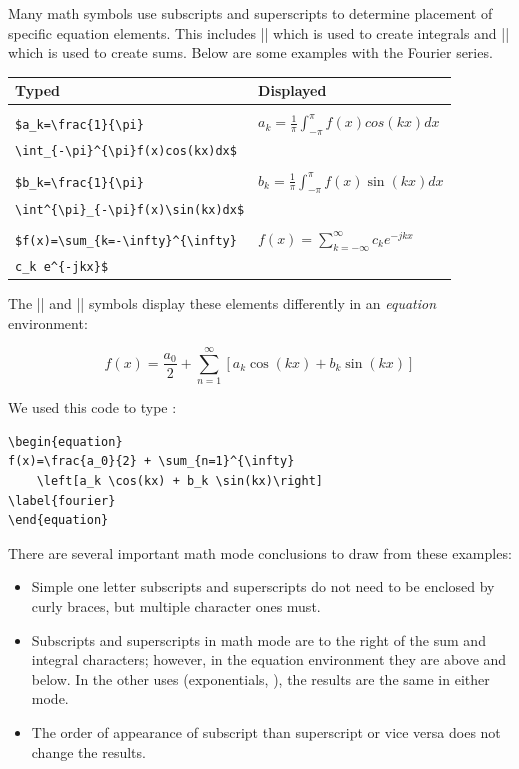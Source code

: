 Many math symbols use subscripts and superscripts to determine placement of
specific equation elements.  This includes |\int| which is used to create
integrals and |\sum| which is used to create sums. Below are some examples with
the Fourier series.

\begin{center}
\begin{tabular}{l|l}
Typed                   & Displayed\\\hline
\\
\verb|$a_k=\frac{1}{\pi}|                  & $a_k = \frac{1}{\pi}\int_{-\pi}^{\pi}f(x)cos(kx)dx$\\
\verb|\int_{-\pi}^{\pi}f(x)cos(kx)dx$|      & \\[4pt]
\hline
\\
\verb|$b_k=\frac{1}{\pi}|                  & $b_k = \frac{1}{\pi}\int^{\pi}_{-\pi}f(x)\sin(kx)dx$\\
\verb|\int^{\pi}_{-\pi}f(x)\sin(kx)dx$|      & \\[4pt]
\hline
\\
\verb|$f(x)=\sum_{k=-\infty}^{\infty}| & $f(x)=\sum_{k=-\infty}^{\infty}c_k e^{-jkx}$\\
\verb|c_k e^{-jkx}$|                 & \\[4pt]
\end{tabular}
\end{center}

The |\sum| and |\int| symbols display these elements differently in an \emph{equation} environment:

\begin{equation}
f(x)=\frac{a_0}{2} + \sum_{n=1}^{\infty}\left[a_k \cos(kx) + b_k \sin(kx)\right]
\label{fourier}
\end{equation}

We used this code to type :
\begin{Verbatim}
\begin{equation}
f(x)=\frac{a_0}{2} + \sum_{n=1}^{\infty}
    \left[a_k \cos(kx) + b_k \sin(kx)\right]
\label{fourier}
\end{equation}
\end{Verbatim}

There are several important math mode conclusions to draw from these examples:
\begin{itemize}
  \item Simple one letter subscripts and superscripts do not need to be enclosed by curly braces, but multiple character ones must.
  \item Subscripts and superscripts in math mode are to the right of
    the sum and integral characters; however, in the equation
    environment they are above and below.  In the other uses
    (exponentials, \etc), the results are the same in either mode.
  \item The order of appearance of subscript than superscript or vice versa does not change the results.
\end{itemize}


